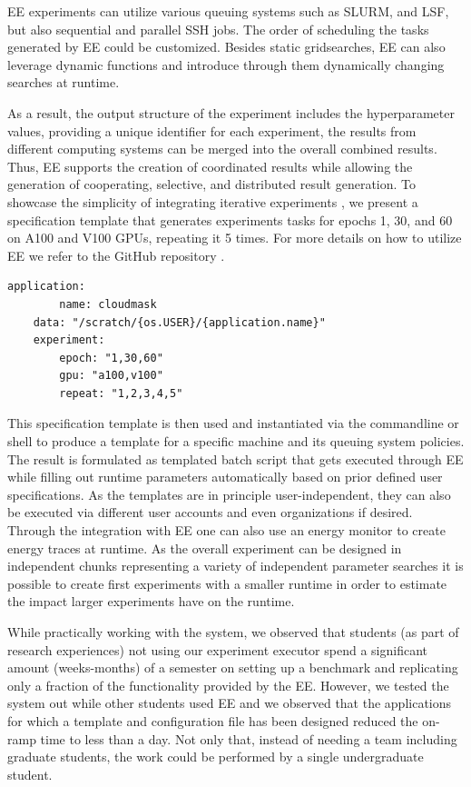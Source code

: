 \documentclass[sigconf]{acmart}
\begin{document}
EE experiments can utilize various queuing systems such as SLURM, and LSF, but also sequential and parallel SSH jobs. The order of scheduling the tasks generated by EE could be customized. Besides static gridsearches, EE can also leverage dynamic functions and introduce through them dynamically changing searches at runtime.

As a result, the output structure of the experiment includes the hyperparameter values, providing a unique identifier for each experiment, the results from different computing systems can be merged into the overall combined results. Thus, EE supports the creation of coordinated results while allowing the generation of cooperating, selective, and distributed result generation. To showcase the simplicity of integrating iterative experiments  \citep{cloudmesh-cc}, we present a specification template that generates experiments tasks for epochs 1, 30, and 60 on A100 and V100 GPUs, repeating it 5 times. For more details on how to utilize EE we refer to the GitHub repository \citep{cloudmesh-ee}.

{\scriptsize
\begin{lstlisting}[breaklines=true,basicstyle=\small]
    application:
        name: cloudmask
    data: "/scratch/{os.USER}/{application.name}"
    experiment:
        epoch: "1,30,60"
        gpu: "a100,v100"
        repeat: "1,2,3,4,5"
\end{lstlisting}
}

This specification template is then used and instantiated via the commandline or shell to produce a template for a specific machine and its queuing system policies. The result is formulated as templated batch script that gets executed through EE while filling out runtime parameters automatically based on  prior defined user specifications. As the templates are in principle user-independent, they can also be executed via different user accounts and even organizations if desired. Through the integration with EE one can also use an energy monitor to create energy traces at runtime. As the overall experiment can be designed in independent chunks representing a variety of independent parameter searches it is possible to create first experiments with a smaller runtime in order to estimate the impact larger experiments have on the runtime.  

While practically working with the system, we observed that students (as part of research experiences) not using our experiment executor spend a significant amount (weeks-months) of a semester on setting up a benchmark and replicating only a fraction of the functionality provided by the EE. However, we tested the system out while other students used EE and we observed that the applications for which a template and configuration file has been designed reduced the on-ramp time to less than a day. Not only that, instead of needing a team including graduate students, the work could be performed by a single undergraduate student.
\end{document}
